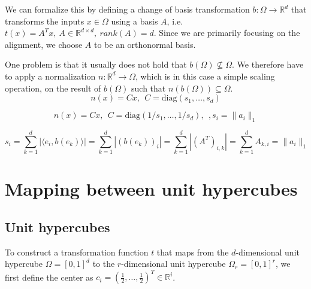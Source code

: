 \documentclass[
  a4paper,  %
  twoside,  %
  bibliography=totoc,
  headsepline,
  cleardoublepage=empty,
  parskip=half,
  draft=false
]{scrbook}
\begin{document}
We can formalize this by defining a change of basis transformation $b \colon \Omega \to \mathds{R}^d$ that transforms the inputs $x \in \Omega$ using a basis $A$, i.e. $t(x)=A^Tx, ~ A \in \mathds{R}^{d \times d}, ~ rank(A)=d$.
Since we are primarily focusing on the alignment, we choose $A$ to be an orthonormal basis.

One problem is that it usually does not hold that $b(\Omega) \nsubseteq \Omega$.
We therefore have to apply a normalization $n \colon \mathds{R}^d \to \Omega$, which is in this case a simple scaling operation, on the result of $b(\Omega)$ such that $n(b(\Omega)) \subseteq \Omega$.
\begin{equation}
n(x)=Cx , ~~
C=\text{diag}(s_1, \dots, s_d)
\label{alignment}
\end{equation}

\begin{equation}
n(x)=Cx , ~~
C=\text{diag}(1 / s_1, \dots, 1 / s_d), ~~, s_i = \|a_i\|_1
\label{alignment}
\end{equation}

\begin{equation}
s_i=\sum_{k=1}^d |\langle e_i, b(e_k) \rangle| = \sum_{k=1}^d |(b(e_k))_i| = \sum_{k=1}^d |(A^T)_{i,k}| = \sum_{k=1}^d A_{k,i}= \|a_i\|_1
\end{equation}

\section{Mapping between unit hypercubes}

\subsection{Unit hypercubes}

To construct a transformation function $t$ that maps from the $d$-dimensional unit hypercube $\Omega=[0,1]^d$ to the $r$-dimensional unit hypercube $\Omega_r=[0,1]^r$, we first define the center  as $c_i=(\frac{1}{2}, \dots, \frac{1}{2})^T\in \mathbb{R}^i$.
\end{document}
